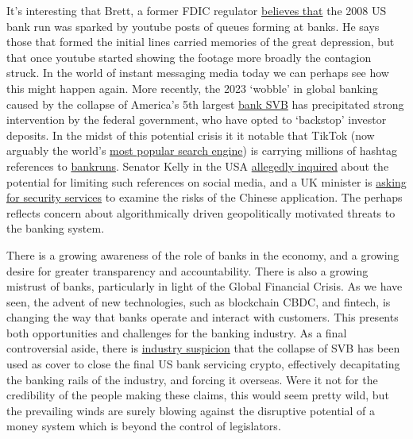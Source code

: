It's interesting that Brett, a former FDIC regulator \href{https://blog.orchid.com/exfdic-regulator-on-trust-and-the-battle-of-the-social-media-videos/}{believes that} the 2008 US bank run was sparked by youtube posts of queues forming at banks. He says those that formed the initial lines carried memories of the great depression, but that once youtube started showing the footage more broadly the contagion struck. In the world of instant messaging media today we can perhaps see how this might happen again. More recently, the 2023 `wobble' in global banking caused by the collapse of America's 5th largest \href{https://theconversation.com/why-svb-and-signature-bank-failed-so-fast-and-the-us-banking-crisis-isnt-over-yet-201737}{bank SVB} has precipitated strong intervention by the federal government, who have opted to `backstop' investor deposits. In the midst of this potential crisis it it notable that TikTok (now arguably the world's \href{https://blog.cloudflare.com/popular-domains-year-in-review-2021/}{most popular search engine}) is carrying millions of hashtag references to \href{https://www.tiktok.com/tag/bankrun?lang=en}{bankruns}. Senator Kelly in the USA \href{https://public.substack.com/p/exclusive-senator-mark-kelly-called}{allegedly inquired} about the potential for limiting such references on social media, and a UK minister is \href{https://news.sky.com/story/tiktok-ban-minister-asks-national-cyber-security-centre-to-look-into-safety-of-app-12833371}{asking for security services} to examine the risks of the Chinese application. The perhaps reflects concern about algorithmically driven geopolitically motivated threats to the banking system.\par
There is a growing awareness of the role of banks in the economy, and a growing desire for greater transparency and accountability. There is also a growing mistrust of banks, particularly in light of the Global Financial Crisis. As we have seen, the advent of new technologies, such as blockchain CBDC, and fintech, is changing the way that banks operate and interact with customers. This presents both opportunities and challenges for the banking industry. As a final controversial aside, there is \href{https://apnews.com/article/signature-bank-fdic-barney-frank-silicon-valley-6ad86262d9945675a42d735b66ace4f2}{industry suspicion} that the collapse of SVB has been used as cover to close the final US bank servicing crypto, effectively decapitating the banking rails of the industry, and forcing it overseas. Were it not for the credibility of the people making these claims, this would seem pretty wild, but the prevailing winds are surely blowing against the disruptive potential of a money system which is beyond the control of legislators.
